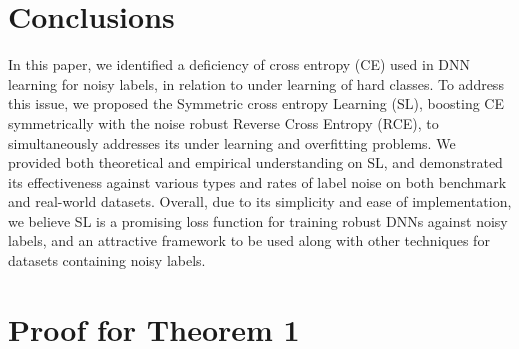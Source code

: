 \documentclass[10pt,twocolumn,letterpaper]{article}
\begin{document}
\section{Conclusions}\label{sec:conclusion}
In this paper, we identified a deficiency of cross entropy (CE) used in DNN learning for noisy labels, in relation to under learning of hard classes. To address this issue, we proposed the Symmetric cross entropy Learning (SL), boosting CE symmetrically with the noise robust Reverse Cross Entropy (RCE), to simultaneously addresses its under learning and overfitting problems. We provided both theoretical and empirical understanding on SL, and demonstrated its effectiveness against various types and rates of label noise on both benchmark and real-world datasets. Overall, due to its simplicity and ease of implementation, we believe SL is a promising loss function for training robust DNNs against noisy labels, and an attractive framework to be used along with other techniques for datasets containing noisy labels.

{
\small


}

\newpage
\onecolumn
\appendix
\setcounter{theorem}{0}

\section{Proof for Theorem 1}\label{appendix_proof}
\end{document}
